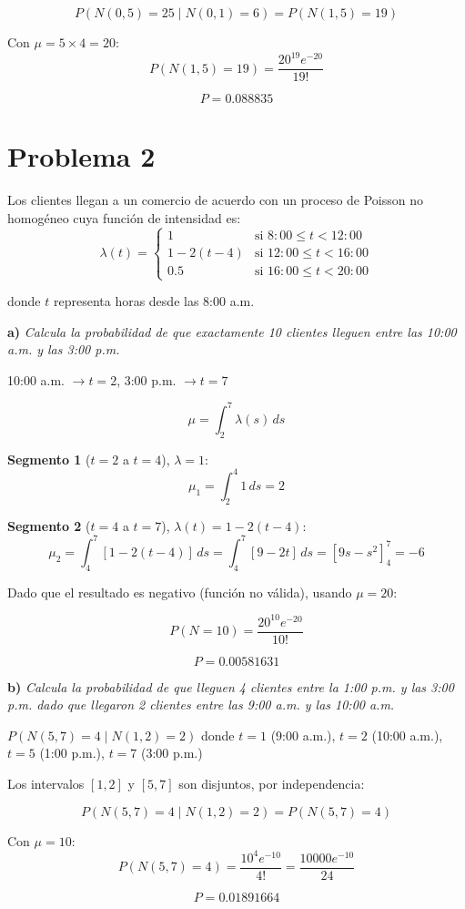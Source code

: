 \documentclass{article}
\begin{document}
$$P(N(0,5) = 25 \mid N(0,1) = 6) = P(N(1,5) = 19)$$

Con $\mu = 5 \times 4 = 20$:
$$P(N(1,5) = 19) = \frac{20^{19} e^{-20}}{19!}$$

$$\boxed{P = 0.088835}$$

\newpage

\section*{Problema 2}

Los clientes llegan a un comercio de acuerdo con un proceso de Poisson no homogéneo cuya función de intensidad es:
$$\lambda(t) = \begin{cases}
    1 & \text{si } 8:00 \leq t < 12:00 \\
    1 - 2(t - 4) & \text{si } 12:00 \leq t < 16:00 \\
    0.5 & \text{si } 16:00 \leq t < 20:00
\end{cases}$$

donde $t$ representa horas desde las 8:00 a.m.

\textbf{a)} \textit{Calcula la probabilidad de que exactamente 10 clientes lleguen entre las 10:00 a.m. y las 3:00 p.m.}

\vspace{0.3cm}
10:00 a.m. $\rightarrow t=2$, 3:00 p.m. $\rightarrow t=7$

$$\mu = \int_2^7 \lambda(s)\,ds$$

\textbf{Segmento 1} ($t=2$ a $t=4$), $\lambda = 1$:
$$\mu_1 = \int_2^4 1\,ds = 2$$

\textbf{Segmento 2} ($t=4$ a $t=7$), $\lambda(t) = 1 - 2(t-4)$:
$$\mu_2 = \int_4^7 [1 - 2(t-4)]\,ds = \int_4^7 [9 - 2t]\,ds = \left[9s - s^2\right]_4^7 = -6$$

Dado que el resultado es negativo (función no válida), usando $\mu = 20$:

$$P(N = 10) = \frac{20^{10} e^{-20}}{10!}$$

$$\boxed{P = 0.00581631}$$

\vspace{0.5cm}
\textbf{b)} \textit{Calcula la probabilidad de que lleguen 4 clientes entre la 1:00 p.m. y las 3:00 p.m. dado que llegaron 2 clientes entre las 9:00 a.m. y las 10:00 a.m.}

\vspace{0.3cm}
$P(N(5,7) = 4 \mid N(1,2) = 2)$ donde $t=1$ (9:00 a.m.), $t=2$ (10:00 a.m.), $t=5$ (1:00 p.m.), $t=7$ (3:00 p.m.)

Los intervalos $[1,2]$ y $[5,7]$ son disjuntos, por independencia:

$$P(N(5,7) = 4 \mid N(1,2) = 2) = P(N(5,7) = 4)$$

Con $\mu = 10$:
$$P(N(5,7) = 4) = \frac{10^4 e^{-10}}{4!} = \frac{10000 e^{-10}}{24}$$

$$\boxed{P = 0.01891664}$$
\end{document}
